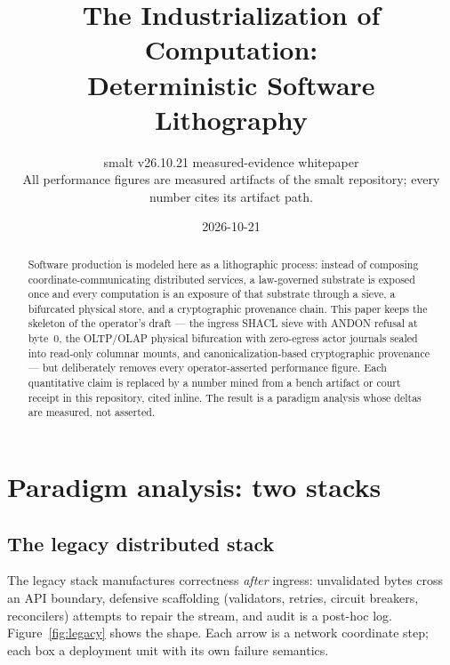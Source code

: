 \documentclass[11pt,a4paper]{article}
\title{The Industrialization of Computation:\\ Deterministic Software Lithography}
\author{smalt v26.10.21 measured-evidence whitepaper\\ \small All performance figures are measured artifacts of the smalt repository; every number cites its artifact path.}
\date{2026-10-21}
\begin{document}
\maketitle

\begin{abstract}
Software production is modeled here as a lithographic process: instead of composing
coordinate-communicating distributed services, a law-governed substrate is exposed once and
every computation is an exposure of that substrate through a sieve, a bifurcated physical
store, and a cryptographic provenance chain. This paper keeps the skeleton of the operator's
draft --- the ingress SHACL sieve with ANDON refusal at byte~0, the OLTP/OLAP physical
bifurcation with zero-egress actor journals sealed into read-only columnar mounts, and
canonicalization-based cryptographic provenance --- but deliberately removes every
operator-asserted performance figure. Each quantitative claim is replaced by a number mined
from a bench artifact or court receipt in this repository, cited inline. The result is a
paradigm analysis whose deltas are measured, not asserted.
\end{abstract}

\section{Paradigm analysis: two stacks}

\subsection{The legacy distributed stack}

The legacy stack manufactures correctness \emph{after} ingress: unvalidated bytes cross an
API boundary, defensive scaffolding (validators, retries, circuit breakers, reconcilers)
attempts to repair the stream, and audit is a post-hoc log. Figure~\ref{fig:legacy} shows the
shape. Each arrow is a network coordinate step; each box a deployment unit with its own
failure semantics.
\end{document}
